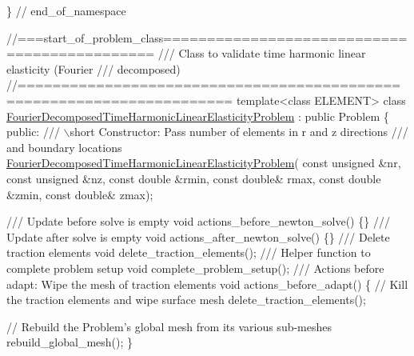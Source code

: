 \begin{DoxyCodeInclude}
 
\} \textcolor{comment}{// end\_of\_namespace}


\textcolor{comment}{//===start\_of\_problem\_class=============================================}\textcolor{comment}{}
\textcolor{comment}{/// Class to validate time harmonic linear elasticity (Fourier }
\textcolor{comment}{/// decomposed)}
\textcolor{comment}{}\textcolor{comment}{//======================================================================}
\textcolor{keyword}{template}<\textcolor{keyword}{class} ELEMENT>
\textcolor{keyword}{class }\hyperlink{classFourierDecomposedTimeHarmonicLinearElasticityProblem}{FourierDecomposedTimeHarmonicLinearElasticityProblem}
       : \textcolor{keyword}{public} Problem
\{
\textcolor{keyword}{public}:
\textcolor{comment}{}
\textcolor{comment}{ /// \(\backslash\)short Constructor: Pass number of elements in r and z directions }
\textcolor{comment}{ /// and boundary locations}
\textcolor{comment}{} \hyperlink{classFourierDecomposedTimeHarmonicLinearElasticityProblem}{FourierDecomposedTimeHarmonicLinearElasticityProblem}(
 \textcolor{keyword}{const} \textcolor{keywordtype}{unsigned} &nr, \textcolor{keyword}{const} \textcolor{keywordtype}{unsigned} &nz,
 \textcolor{keyword}{const} \textcolor{keywordtype}{double} &rmin, \textcolor{keyword}{const} \textcolor{keywordtype}{double}& rmax,
 \textcolor{keyword}{const} \textcolor{keywordtype}{double} &zmin, \textcolor{keyword}{const} \textcolor{keywordtype}{double}& zmax);

 \textcolor{comment}{}
\textcolor{comment}{ /// Update before solve is empty}
\textcolor{comment}{} \textcolor{keywordtype}{void} actions\_before\_newton\_solve() \{\}
\textcolor{comment}{}
\textcolor{comment}{ /// Update after solve is empty}
\textcolor{comment}{} \textcolor{keywordtype}{void} actions\_after\_newton\_solve() \{\}
 \textcolor{comment}{}
\textcolor{comment}{ /// Delete traction elements}
\textcolor{comment}{} \textcolor{keywordtype}{void} delete\_traction\_elements();
 \textcolor{comment}{}
\textcolor{comment}{ /// Helper function to complete problem setup}
\textcolor{comment}{} \textcolor{keywordtype}{void} complete\_problem\_setup();
\textcolor{comment}{}
\textcolor{comment}{ /// Actions before adapt: Wipe the mesh of traction elements}
\textcolor{comment}{} \textcolor{keywordtype}{void} actions\_before\_adapt()
  \{
   \textcolor{comment}{// Kill the traction elements and wipe surface mesh}
   delete\_traction\_elements();
   
   \textcolor{comment}{// Rebuild the Problem's global mesh from its various sub-meshes}
   rebuild\_global\_mesh();
  \}


\end{DoxyCodeInclude}
